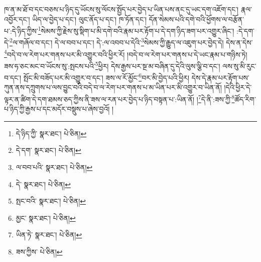 ཁ་ན་མ་ཐོ་བ་དང་བཅས་པ་ཉིད་དུ་ཡོངས་སུ་ལོངས་སྤྱོད་པར་བྱེད་པ་ཡིན་པས་ནང་དུ་ཡང་དག་འཇོག་དང་། རྣལ་འབྱོར་དང་། ཡིད་ལ་བྱེད་པ་དང་། ལུང་ནོད་པ་དང་། ཁ་ཏོན་དང་། དོན་སེམས་པའི་དགེ་བའི་ཕྱོགས་ལ་བརྩོན་པ་:དེ་ཉིད་ཀྱིས་\footnote{དེ་ཉིད་ཀྱི་  སྣར་ཐང་།  པེ་ཅིན། }སེམས་ཀྱི་རྗེས་སུ་སྡིག་པ་མི་དགེ་བའི་རྣམ་པར་རྟོག་པ་དེ་དག་ཉིད་ཟག་པར་འགྱུར་ཞིང་། :དེ་དག་དེ་\footnote{དེ་དག་  སྣར་ཐང་།  པེ་ཅིན། }ལ་གཞོལ་བ་དང་། དེ་ལ་བབ་པ་དང་། དེ་:ལ་འབབ་པ་དེའི་\footnote{ལ་བབ་པའི་  སྣར་ཐང་།  པེ་ཅིན། }སེམས་ཀྱི་རྒྱུད་ལ་འཇུག་པར་བྱེད་དེ། དེས་ན་དེས་\footnote{དེ་  སྣར་ཐང་།  པེ་ཅིན། }བདེ་བ་ལ་རེག་པར་གནས་པར་མི་འགྱུར་བའི་ཕྱིར་རོ། །བདེ་བ་ལ་རེག་པར་གནས་པ་དེ་ཡང་རྣམ་པ་གཉིས་ཏེ། ཟས་ཧ་ཅང་མང་བ་ཡོངས་སུ་:སྤངས་པའི་\footnote{སྤང་བའི་  སྣར་ཐང་།  པེ་ཅིན། }ཕྱིར། དེས་རྒྱས་པར་སྔ་མ་བཞིན་དུ་དེའི་ལུས་ལྕི་བ་དང་། ལས་སུ་མི་རུང་བ་དང་། སྤོང་མི་བཟོད་པར་མི་འགྱུར་བ་དང་། ཟས་ལ་རོ་མྱོང་\footnote{མྱང་  སྣར་ཐང་།  པེ་ཅིན། }བར་མི་བྱེད་པའི་ཕྱིར། དེས་དེ་རྣམ་པར་རྟོག་པས་ཀུན་ནས་དཀྲུགས་པ་ལས་བྱུང་བའི་བདེ་བ་ལ་རེག་པར་གནས་པ་མ་ཡིན་པར་མི་འགྱུར་བ་ཡིན་ནོ། །དེའི་ཕྱིར་དེ་ལྟར་ན་ཚིག་དེ་དག་ཐམས་ཅད་ཀྱིས་ནི་ཟས་ལ་རན་པར་བྱེད་པ་ཉིད་བསྟན་པ་:ཡིན་ནོ། །\footnote{ཡིན་ཏེ་  སྣར་ཐང་།  པེ་ཅིན། }དེ་ནི་:ཟས་ཀྱི་\footnote{ཟས་ཀྱིས་  པེ་ཅིན། }ཚོད་རིག་པ་ཉིད་ཀྱི་རྒྱས་པ་དང་མདོར་བསྡུས་པ་ཞེས་བྱའོ། །
